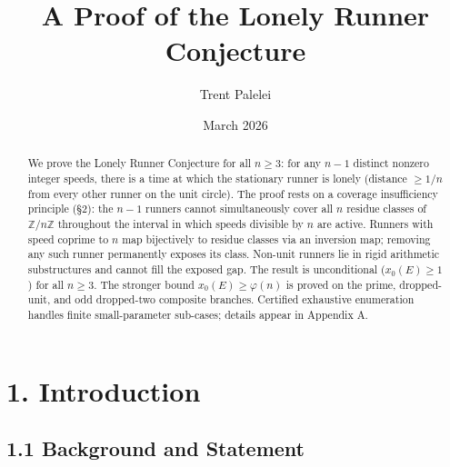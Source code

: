 \documentclass[11pt,a4paper]{article}
\title{A Proof of the Lonely Runner Conjecture}
\author{Trent Palelei}
\date{March 2026}
\theoremstyle{plain}
\theoremstyle{definition}
\theoremstyle{remark}
\begin{document}
\maketitle
\tableofcontents
\newpage

\begin{abstract}
We prove the Lonely Runner Conjecture for all $n \geq 3$: for any $n-1$ distinct nonzero integer speeds, there is a time at which the stationary runner is lonely (distance $\geq 1/n$ from every other runner on the unit circle).
The proof rests on a coverage insufficiency principle (§2): the $n-1$ runners cannot simultaneously cover all $n$ residue classes of $\mathbb{Z}/n\mathbb{Z}$ throughout the interval in which speeds divisible by $n$ are active. Runners with speed coprime to $n$ map bijectively to residue classes via an inversion map; removing any such runner permanently exposes its class. Non-unit runners lie in rigid arithmetic substructures and cannot fill the exposed gap.
The result is unconditional ($x_0(E) \geq 1$) for all $n \geq 3$. The stronger bound $x_0(E) \geq \varphi(n)$ is proved on the prime, dropped-unit, and odd dropped-two composite branches. Certified exhaustive enumeration handles finite small-parameter sub-cases; details appear in Appendix A.
\end{abstract}

\medskip



\section{1. Introduction}



\subsection{1.1 Background and Statement}
\end{document}
